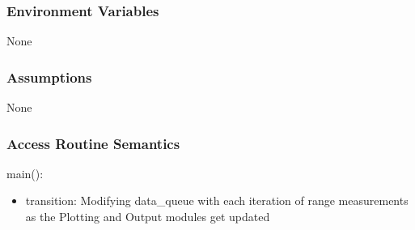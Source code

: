 \documentclass[12pt, titlepage]{article}
\begin{document}
\subsubsection{Environment Variables}
None

\subsubsection{Assumptions}
None
  
\subsubsection{Access Routine Semantics} \label{main_code}

\noindent main():
\begin{itemize}
\item transition: Modifying data\_queue with each iteration of range measurements as the Plotting and Output modules get updated 
\end{itemize}
\end{document}
